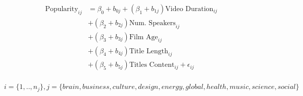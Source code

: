 \begin{align}
\begin{split}
\text{Popularity}_{ij}&=\beta_0+b_{0j}+(\beta_1+b_{1j})\text{Video Duration}_{ij}\\
&+(\beta_2+b_{2j})\text{Num. Speakers}_{ij}\\
&+(\beta_3+b_{3j})\text{Film Age}_{ij}\\
&+(\beta_4+b_{4j})\text{Title Length}_{ij}\\
&+(\beta_5+b_{5j})\text{Titles Content}_{ij}+\epsilon_{ij}\\
\end{split}
\label{linear_mixed_themes_eqn}
\end{align}

\begin{equation*}
i=\{1,..,n_j\}, j=\{brain, business, culture, design, energy, global, health, music, science, social\}
\end{equation*}
